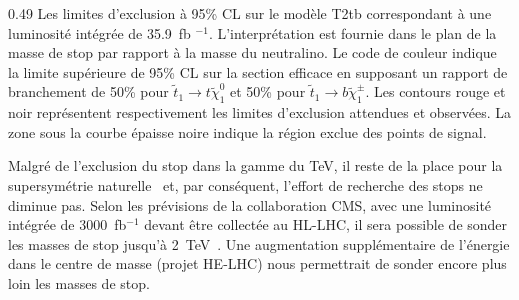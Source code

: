                  {0.49}       %
                 {Les limites d'exclusion à 95\% CL sur le modèle T2tb correspondant à une luminosité intégrée de 35.9~fb $^{-1}$. L'interprétation est fournie dans le plan de la masse de stop par rapport à la masse du neutralino. Le code de couleur indique la limite supérieure de 95\% CL sur la section efficace en supposant un rapport de branchement de 50\% pour $\tilde{t}_{1} \to t \tilde {\chi}^{0}_{1} $ et 50\% pour $\tilde{t}_{1} \to b \tilde{\chi}^{\pm}_{1} $. Les contours rouge et noir représentent respectivement les limites d'exclusion attendues et observées. La zone sous la courbe épaisse noire indique la région exclue des points de signal. }




Malgré de l’exclusion du stop dans la gamme du TeV, il reste de la place pour la supersymétrie naturelle~\cite{Baer:2016bwh} et, par conséquent, l’effort de recherche des stops ne diminue pas. Selon les prévisions de la collaboration CMS, avec une luminosité intégrée de 3000~fb$^{-1} $ devant être collectée au HL-LHC, il sera possible de sonder les masses de stop jusqu'à 2~TeV~\cite{website:moriond}. Une augmentation supplémentaire de l’énergie dans le centre de masse (projet HE-LHC)  nous permettrait de sonder encore plus loin les masses de stop.

